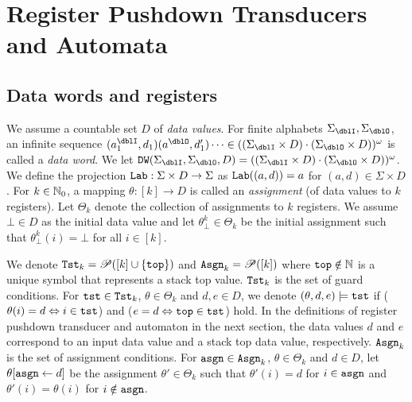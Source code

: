 \section{Register Pushdown Transducers and Automata}
\subsection{Data words and registers}
We assume a countable set $D$ of \emph{data values}.
For finite alphabets $\Sigma_\dblI,\Sigma_\dblO$,
an infinite sequence $(a^\dblI_1,d_1)(a^\dblO,d'_1)\cdots \in ((\Sigma_\dblI\times D)\cdot(\Sigma_\dblO\times D))^\omega$ is called a \emph{data word}.
We let $\DW(\Sigma_\dblI,\Sigma_\dblO,D)=((\Sigma_\dblI\times D)\cdot(\Sigma_\dblO\times D))^\omega$.
We define the projection $\mathtt{Lab}: \Sigma\times D \to \Sigma$ as $\mathtt{Lab}((a,d))=a$ for $(a,d)\in \Sigma\times D$.
For $k\in\mathbb{N}_0$, a mapping $\theta: [k] \to D$ is called an \emph{assignment}
(of data values to $k$ registers).
Let $\Theta_k$ denote the collection of assignments to $k$ registers.
We assume $\bot\in D$ as the initial data value and
let $\theta^k_\bot\in\Theta_k$ be the initial assignment such that
$\theta^k_\bot(i)=\bot$ for all $i\in[k]$.

We denote $\mathtt{Tst}_k = \mathscr{P}([k]\cup\{\mathtt{top}\})$ and $\mathtt{Asgn}_k = \mathscr{P}([k])$
where $\mathtt{top}\notin\mathbb{N}$ is a unique symbol that represents a stack top value.
$\mathtt{Tst}_k$ is the set of guard conditions.
For $\mathtt{tst}\in\mathtt{Tst}_k$, $\theta\in\Theta_k$ and $d,e\in D$,
we denote $(\theta,d,e)\models\mathtt{tst}$
if ($\theta(i) = d \Leftrightarrow i\in\mathtt{tst}$)
and ($e = d \Leftrightarrow \mathtt{top}\in\mathtt{tst}$) hold.
In the definitions of register pushdown transducer and automaton in the next section,
the data values $d$ and $e$ correspond to an input data value and a stack top data value, respectively.
$\mathtt{Asgn}_k$ is the set of assignment conditions.
For $\mathtt{asgn}\in\mathtt{Asgn}_k$, $\theta\in\Theta_k$ and $d\in D$,
let $\theta[\mathtt{asgn}\leftarrow d]$ be the assignment
$\theta'\in\Theta_k$ such that $\theta'(i) = d$ for $i\in\mathtt{asgn}$ and $\theta'(i)=\theta(i)$ for $i\notin\mathtt{asgn}$.

